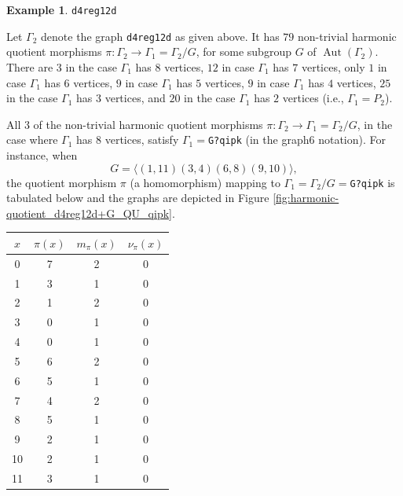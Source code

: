 \documentclass[12pt,letterpaper]{article}
\theoremstyle{definition}
\newtheorem{example}[theorem]{Example}
\DeclareMathOperator{\Aut}{Aut}
\begin{document}
\begin{example}%
  {\tt d4reg12d}\newline
\label{example:d4reg12d}  
{\rm  
  Let $\Gamma_2$ denote the graph {\tt d4reg12d} as given above.
It has $79$  non-trivial harmonic quotient morphisms
$\pi: \Gamma_2\to \Gamma_1=\Gamma_2/G$,
for some subgroup $G$ of $\Aut(\Gamma_2)$.
There are $3$ in the case $\Gamma_1$ has $8$ vertices,
$12$ in case $\Gamma_1$ has $7$ vertices,
only $1$ in case $\Gamma_1$ has $6$ vertices,
$9$ in case $\Gamma_1$ has $5$ vertices,
$9$ in case $\Gamma_1$ has $4$ vertices,
$25$ in the case $\Gamma_1$ has $3$ vertices,
and  $20$ in the case $\Gamma_1$ has $2$ vertices
(i.e., $\Gamma_1=P_2$).

All $3$ of the non-trivial harmonic quotient morphisms
$\pi: \Gamma_2\to \Gamma_1=\Gamma_2/G$, in the case where
$\Gamma_1$ has $8$ vertices, satisfy $\Gamma_1=$\verb+G?qipk+
(in the graph6 notation).
For instance, when
\[
G = \langle  (1,11)(3,4)(6,8)(9,10) \rangle ,
\]
the quotient morphism $\pi$ (a homomorphism) mapping to
$\Gamma_1=\Gamma_2/G =$\verb+G?qipk+
is tabulated below
and the graphs are depicted in
Figure \ref{fig:harmonic-quotient_d4reg12d+G_QU_qipk}. 

\begin{center}
\begin{tabular}{c|c|c|c}  
  $x$ & $\pi(x)$ & $m_\pi(x)$ & $\nu_\pi(x)$   \\ \hline
  0   &    7   &        2         &  0  \\ 
  1   &    3   &        1         &  0  \\ 
  2   &    1   &        2         &  0  \\ 
  3   &    0   &        1         &  0   \\
  4   &    0   &        1         &  0   \\
  5   &    6   &        2         &  0   \\
  6   &    5   &        1         &  0   \\
  7   &    4   &        2         &  0   \\
  8   &    5   &        1         &  0   \\
  9   &    2   &        1         &  0  \\   
  10  &    2  &        1         &  0  \\
  11  &    3   &        1         &  0  \\  
\end{tabular}
\end{center}

}
\end{example}
\end{document}
